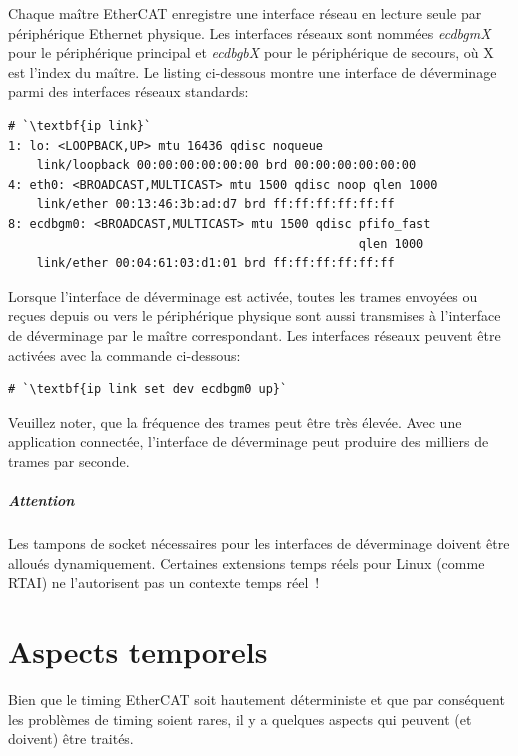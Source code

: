 \documentclass[a4paper,12pt,BCOR6mm,bibtotoc,idxtotoc]{scrbook}
\begin{document}
Chaque ma\^itre EtherCAT enregistre une interface r\'eseau en lecture
seule par p\'eriph\'erique Ethernet physique.  Les interfaces
r\'eseaux sont nomm\'ees \textit{ecdbgmX} pour le p\'eriph\'erique
principal et \textit{ecdbgbX} pour le p\'eriph\'erique de secours,
o\`u X est l'index du ma\^itre.  Le listing ci-dessous montre une
interface de d\'everminage parmi des interfaces r\'eseaux standards:

\begin{lstlisting}
# `\textbf{ip link}`
1: lo: <LOOPBACK,UP> mtu 16436 qdisc noqueue
    link/loopback 00:00:00:00:00:00 brd 00:00:00:00:00:00
4: eth0: <BROADCAST,MULTICAST> mtu 1500 qdisc noop qlen 1000
    link/ether 00:13:46:3b:ad:d7 brd ff:ff:ff:ff:ff:ff
8: ecdbgm0: <BROADCAST,MULTICAST> mtu 1500 qdisc pfifo_fast
                                                 qlen 1000
    link/ether 00:04:61:03:d1:01 brd ff:ff:ff:ff:ff:ff
\end{lstlisting}

Lorsque l'interface de d\'everminage est activ\'ee, toutes les trames
envoy\'ees ou re\c{c}ues depuis ou vers le p\'eriph\'erique physique
sont aussi transmises \`a l'interface de d\'everminage par le ma\^itre
correspondant. Les interfaces r\'eseaux peuvent \^etre activ\'ees avec
la commande ci-dessous:

\begin{lstlisting}
# `\textbf{ip link set dev ecdbgm0 up}`
\end{lstlisting}

Veuillez noter, que la fr\'equence des trames peut \^etre tr\`es \'elev\'ee.
Avec une application connect\'ee, l'interface de d\'everminage
peut produire des milliers de trames par seconde.

\paragraph{Attention} Les tampons de socket n\'ecessaires pour les interfaces
de d\'everminage doivent \^etre allou\'es dynamiquement.
Certaines extensions temps r\'eels pour Linux (comme RTAI)
ne l'autorisent pas un contexte temps r\'eel~!


\chapter{Aspects temporels}
\label{sec:timing}

Bien que le timing EtherCAT soit hautement d\'eterministe et que par
cons\'equent les probl\`emes de timing soient rares, il y a quelques aspects
qui peuvent (et doivent) \^etre trait\'es.
\end{document}
